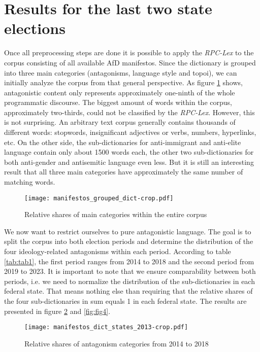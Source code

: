 \documentclass[a4paper]{scrreprt}
\begin{document}
\section{Results for the last two state elections}
Once all preprocessing steps are done it is possible to apply the {\em RPC-Lex} to the corpus consisting of all available AfD manifestos. Since the dictionary is grouped into three main categories (antagonisms, language style and topoi), we can initially analyze the corpus from that general perspective. As figure \ref{fig:fig2} shows, antagonistic content only represents approximately one-ninth of the whole programmatic discourse. The biggest amount of words within the corpus, approximately two-thirds, could not be classified by the {\em RPC-Lex}. However, this is not surprising. An arbitrary text corpus generally contains thousands of different words: stopwords, insignificant adjectives or verbs, numbers, hyperlinks, etc. On the other side, the sub-dictionaries for anti-immigrant and anti-elite language contain only about 1500 words each, the other two sub-dictionaries for both anti-gender and antisemitic language even less. But it is still an interesting result that all three main categories have approximately the same number of matching words.\par
\begin{figure}[ht]
    \centering
    \texttt{[image: manifestos\_grouped\_dict-crop.pdf]}
    \caption{Relative shares of main categories within the entire corpus}
    \label{fig:fig2}
\end{figure}
We now want to restrict ourselves to pure antagonistic language. The goal is to split the corpus into both election periods and determine the distribution of the four ideology-related antagonisms within each period. According to table \ref{tab:tab1}, the first period ranges from 2014 to 2018 and the second period from 2019 to 2023. It is important to note that we ensure comparability between both periods, i.e. we need to normalize the distribution of the sub-dictionaries in each federal state. That means nothing else than requiring that the relative shares of the four sub-dictionaries in sum equals 1 in each federal state. The results are presented in figure \ref{fig:fig3} and \ref{fig:fig4}.\par
\begin{figure}[ht]
    \centering
    \texttt{[image: manifestos\_dict\_states\_2013-crop.pdf]}
    \caption{Relative shares of antagonism categories from 2014 to 2018}
    \label{fig:fig3}
\end{figure}
\end{document}
